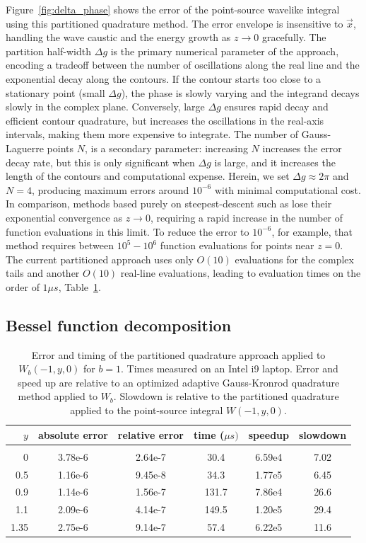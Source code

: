 \documentclass[]{JFM-FLM_Au}
\begin{document}
Figure~\ref{fig:delta_phase} shows the error of the point-source wavelike integral using this partitioned quadrature method. The error envelope is insensitive to $\vec x$, handling the wave caustic and the energy growth as $z\to 0$ gracefully. The partition half-width $\Delta g$ is the primary numerical parameter of the approach, encoding a tradeoff between the number of oscillations along the real line and the exponential decay along the contours. If the contour starts too close to a stationary point (small $\Delta g$), the phase is slowly varying and the integrand decays slowly in the complex plane. Conversely, large $\Delta g$ ensures rapid decay and efficient contour quadrature, but increases the oscillations in the real-axis intervals, making them more expensive to integrate. The number of Gauss-Laguerre points $N$, is a secondary parameter: increasing $N$ increases the error decay rate, but this is only significant when $\Delta g$ is large, and it increases the length of the contours and computational expense. Herein, we set $\Delta g \approx 2\pi$ and $N=4$, producing maximum errors around $10^{-6}$ with minimal computational cost. In comparison, methods based purely on steepest-descent such as \cite{motygin_numerical_2017} lose their exponential convergence as $z\to 0$, requiring a rapid increase in the number of function evaluations in this limit. To reduce the error to $10^{-6}$, for example, that method requires between $10^5-10^6$ function evaluations for points near $z=0$. The current partitioned approach uses only $O(10)$ evaluations for the complex tails and another $O(10)$ real-line evaluations, leading to evaluation times on the order of $1\mu s$, Table~\ref{tab:wavelike}.

\subsection{Bessel function decomposition}

\begin{table}
    \centering
    \begin{tabular}{r|ccccc}
    $y$    & absolute error   & relative error  & time ($\mu s)$ & speedup   & slowdown \\[1pt]
    \midrule[0.5pt]\\[-8pt]
    0    & 3.78e-6 & 2.64e-7 &  30.4 & 6.59e4 & 7.02   \\
    0.5  & 1.16e-6 & 9.45e-8 &  34.3 &  1.77e5 & 6.45  \\
    0.9  & 1.14e-6 & 1.56e-7 & 131.7 &  7.86e4 & 26.6  \\
    1.1  & 2.09e-6 & 4.14e-7 & 149.5 &  1.20e5 & 29.4  \\
    1.35 & 2.75e-6 & 9.14e-7 &  57.4 &  6.22e5 & 11.6
    \end{tabular}
    \caption{Error and timing of the partitioned quadrature approach applied to $W_b(-1,y,0)$ for $b=1$. Times measured on an Intel i9 laptop. Error and speed up are relative to an optimized adaptive Gauss-Kronrod quadrature method applied to $W_b$. Slowdown is relative to the partitioned quadrature applied to the point-source integral $W(-1,y,0)$.}
    \label{tab:wavelike}
\end{table}
\end{document}

